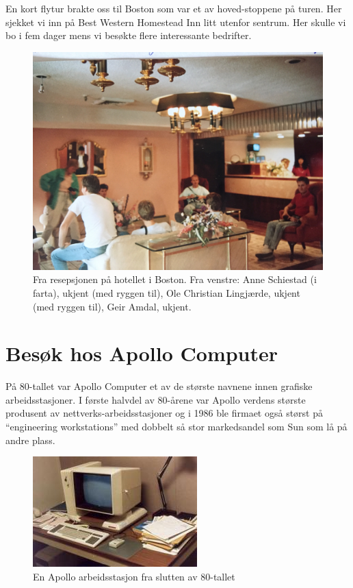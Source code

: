 \documentclass[../../main.tex]{subfiles}
\begin{document}
En kort flytur brakte oss til Boston som var et av hoved-stoppene på turen. Her sjekket vi inn på Best Western Homestead Inn litt utenfor sentrum. Her skulle vi bo i fem dager mens vi besøkte flere interessante bedrifter. 

\begin{figure}
	\includegraphics[width=\linewidth]{images/usa88/IMG_3846.jpg}
	\caption{Fra resepsjonen på hotellet i Boston. Fra venstre: Anne Schiestad (i farta), ukjent (med ryggen til), Ole Christian Lingjærde, ukjent (med ryggen til), Geir Amdal, ukjent.}
\end{figure}

\section{Besøk hos Apollo Computer}

På 80-tallet var Apollo Computer et av de største navnene innen grafiske arbeidsstasjoner. I første halvdel av 80-årene var Apollo verdens største produsent av nettverks-arbeidsstasjoner og i 1986 ble firmaet også størst på “engineering workstations” med dobbelt så stor markedsandel som Sun som lå på andre plass. 

\begin{figure}
	\includegraphics{images/usa88/apollo_workstation.jpg}
	\caption{En Apollo arbeidsstasjon fra slutten av 80-tallet}
\end{figure}
\end{document}
